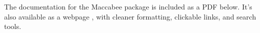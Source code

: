 \documentclass[./main.tex]{subfiles}
\begin{document}
The documentation for the Maccabee package is included as a PDF below. It's also available as a webpage , with cleaner formatting, clickable links, and search tools.


\end{document}
